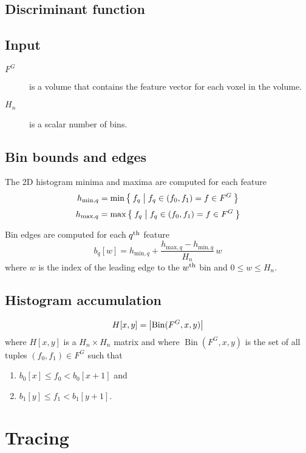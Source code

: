 \documentclass[12pt]{article}
\begin{document}
\subsection{Discriminant function}

\subsection{Input}

\begin{description}
	\item[\(F^{G}\)] is a volume that contains the feature vector for each
		voxel in the volume.
	\item[\(H_n\)] is a scalar number of bins.
\end{description}

\subsection{Bin bounds and edges}

The 2D histogram minima and maxima are computed for each feature
\begin{dmath*}
	h_{\mathrm{min},q} = \min \Set{ f_q | f_q \in ( f_0, f_1 ) = f \in F^{G} }
\end{dmath*}
\begin{dmath*}
	h_{\mathrm{max},q} = \max \Set{ f_q | f_q \in ( f_0, f_1 ) = f \in F^{G} }
\end{dmath*}

Bin edges are computed for each \(q^{\mathrm{th}}\) feature
\begin{dmath*}
	b_q[w] =
		h_{\mathrm{min},q} +
		\frac{ h_{\mathrm{max},q}  - h_{\mathrm{min},q}  }
		     { H_n } \, w
\end{dmath*}
where \(w\) is the index of the leading edge to the
\(w^{\mathrm{th}}\) bin and \( 0 \le w \le  H_n \).

\subsection{Histogram accumulation}

\begin{dmath*}
	H[x,y] =  \Dim{ \operatorname{Bin}(F^G, x, y) }
\end{dmath*}
where \(H[x,y]\) is a \(H_n \times H_n\) matrix and
where \(\operatorname{Bin}(F^G, x, y)\) is the set of all tuples
\((f_0, f_1) \in F^G\) such that
\begin{enumerate}
	\item \(b_0[x] \le f_0 < b_0[x+1]\) and
	\item \(b_1[y] \le f_1 < b_1[y+1]\).
\end{enumerate}



\section{Tracing}
\end{document}
